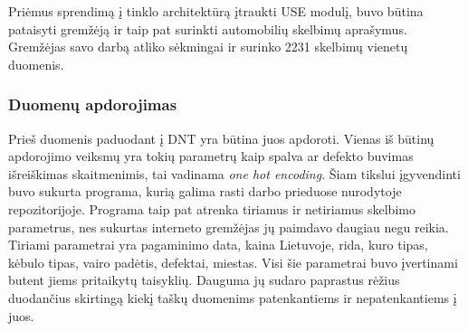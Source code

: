 \documentclass{VUMIFPSkursinis}
\begin{document}
Priėmus sprendimą į tinklo architektūrą įtraukti USE modulį, buvo būtina pataisyti gremžėją ir taip pat surinkti automobilių skelbimų aprašymus. Gremžėjas savo darbą atliko sėkmingai ir surinko 2231 skelbimų vienetų duomenis.

\subsubsection{Duomenų apdorojimas}

Prieš duomenis paduodant į DNT yra būtina juos apdoroti. Vienas iš būtinų apdorojimo veiksmų yra tokių parametrų kaip spalva ar defekto buvimas išreiškimas skaitmenimis, tai vadinama \textit{one hot encoding}. Šiam tikslui įgyvendinti buvo sukurta programa, kurią galima rasti darbo prieduose nurodytoje repozitorijoje. Programa taip pat atrenka tiriamus ir netiriamus skelbimo parametrus, nes sukurtas interneto gremžėjas jų paimdavo daugiau negu reikia. Tiriami parametrai yra pagaminimo data, kaina Lietuvoje, rida, kuro tipas, kėbulo tipas, vairo padėtis, defektai, miestas. Visi šie parametrai buvo įvertinami butent jiems pritaikytų taisyklių. Dauguma jų sudaro paprastus rėžius duodančius skirtingą kiekį taškų duomenims patenkantiems ir nepatenkantiems į juos.
\end{document}
